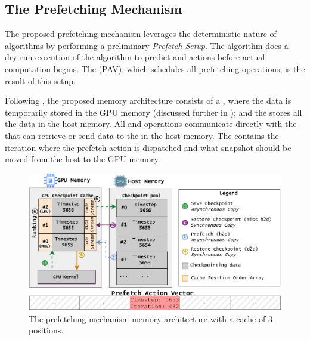 \documentclass[Ingles]{ic-tese-v3}
\begin{document}
\subsection{The Prefetching Mechanism}
\label{sec:gpuzip_prefetch}

The proposed prefetching mechanism leverages the deterministic nature of \checkpointing algorithms by performing a preliminary \textit{Prefetch Setup}. The algorithm does a dry-run execution of the \checkpointing algorithm to predict \save and \restore actions before actual computation begins. The \pav (PAV), which schedules all prefetching operations, is the result of this setup.

Following , the proposed memory architecture consists of a \cache, where the \checkpointing data is temporarily stored in the GPU memory (discussed further in ); and the \pool stores all the \checkpointing data in the host memory. All \save and \restore operations communicate directly with the \cache that can retrieve or send data to the \pool in the host memory. The \pav contains the iteration where the prefetch action is dispatched and what snapshot should be moved from the host to the GPU memory.

\begin{figure}[h!]
  \centering
  \includegraphics[width=0.9\linewidth,trim={0 0 0 0},clip]{figures/arch_prefetch.pdf}
  \caption[Memory architecture diagram (\checkpointprefetching)]{The prefetching mechanism memory architecture with a cache of 3 positions.}
  \label{fig:arch_prefetch}
\end{figure}
\end{document}
